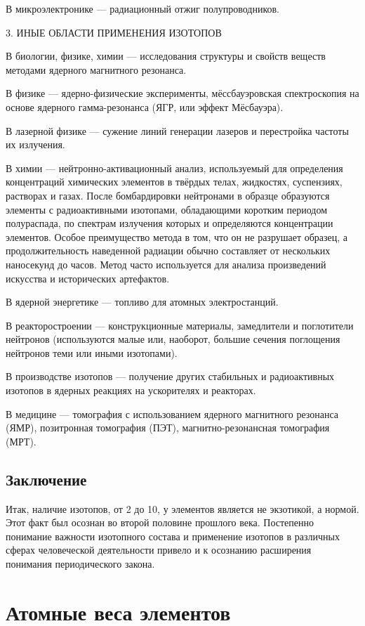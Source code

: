\documentclass[a5paper,openany]{book}
\begin{document}
В микроэлектронике — радиационный отжиг полупроводников.

3. ИНЫЕ ОБЛАСТИ ПРИМЕНЕНИЯ ИЗОТОПОВ

В биологии, физике, химии — исследования структуры и свойств веществ методами ядерного магнитного резонанса.

В физике — ядерно-физические эксперименты, мёссбауэровская спектроскопия на основе ядерного гамма-резонанса (ЯГР, или эффект Мёсбауэра).

В лазерной физике — сужение линий генерации лазеров и перестройка частоты их излучения.

В химии — нейтронно-активационный анализ, используемый для определения концентраций химических элементов в твёрдых телах, жидкостях, суспензиях, растворах и газах. После бомбардировки нейтронами в образце образуются элементы с радиоактивными изотопами, обладающими коротким периодом полураспада, по спектрам излучения которых и определяются концентрации элементов. Особое преимущество метода в том, что он не разрушает образец, а продолжительность наведенной радиации обычно составляет от нескольких наносекунд до часов. Метод часто используется для анализа произведений искусства и исторических артефактов.

В ядерной энергетике — топливо для атомных электростанций.

В реакторостроении — конструкционные материалы, замедлители и поглотители нейтронов (используются малые или, наоборот, большие сечения поглощения нейтронов теми или иными изотопами).

В производстве изотопов — получение других стабильных и радиоактивных изотопов в ядерных реакциях на ускорителях и реакторах.

В медицине — томография с использованием ядерного магнитного резонанса (ЯМР), позитронная томография (ПЭТ), магнитно-резонансная томография (МРТ).

\newpage
\section*{Заключение}
Итак, наличие изотопов, от 2 до 10, у элементов является не экзотикой, а нормой.  Этот факт был осознан во второй половине прошлого века. Постепенно понимание важности изотопного состава и применение изотопов в различных сферах человеческой деятельности привело и к осознанию расширения понимания периодического закона.

\chapter{Атомные веса элементов}
\end{document}

